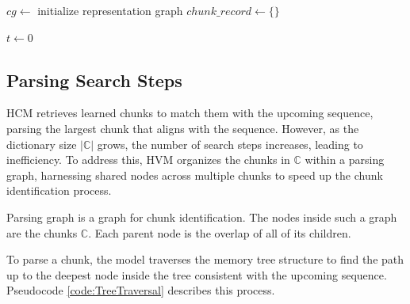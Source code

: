 \documentclass{article} %
\theoremstyle{remark}
\begin{document}
\begin{algorithm}
\SetAlgoLined
{}
$cg \leftarrow$ initialize representation graph\;
$chunk\_record \leftarrow \{\}$\; 

$t \leftarrow 0$\;

\caption{HVM (online version, for learning sequences from human experiments)}
\end{algorithm}


\subsection{Parsing Search Steps} 
\label{SI:PSS}
HCM retrieves learned chunks to match them with the upcoming sequence, parsing the largest chunk that aligns with the sequence. However, as the dictionary size $|\mathbb{C}|$ grows, the number of search steps increases, leading to inefficiency. To address this, HVM organizes the chunks in $\mathbb{C}$ within a parsing graph, harnessing shared nodes across multiple chunks to speed up the chunk identification process.

\begin{definition}
Parsing graph is a graph for chunk identification. The nodes inside such a graph are the chunks $\mathbb{C}$. Each parent node is the overlap of all of its children. 
\end{definition} 

To parse a chunk, the model traverses the memory tree structure to find the path up to the deepest node inside the tree consistent with the upcoming sequence. Pseudocode \ref{code:TreeTraversal} describes this process. 
\end{document}
